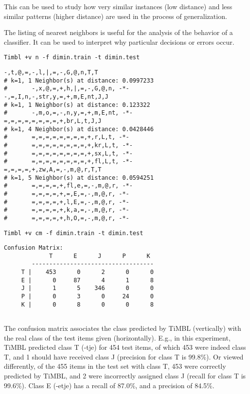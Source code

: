 \documentclass{report}
\begin{document}
This can be used to study how very similar instances (low distance) and
less similar patterns (higher distance) are used in the process of
generalization.

The listing of nearest neighbors is useful for the analysis of the
behavior of a classifier. It can be used to interpret why particular
decisions or errors occur.

{\small
\begin{verbatim}
Timbl +v n -f dimin.train -t dimin.test
\end{verbatim}
}

{\small
\begin{verbatim}
-,t,@,=,-,l,|,=,-,G,@,n,T,T
# k=1, 1 Neighbor(s) at distance: 0.0997233
#       -,x,@,=,+,h,|,=,-,G,@,n, -*-
-,=,I,n,-,str,y,=,+,m,E,nt,J,J
# k=1, 1 Neighbor(s) at distance: 0.123322
#       -,m,o,=,-,n,y,=,+,m,E,nt, -*-
=,=,=,=,=,=,=,=,+,br,L,t,J,J
# k=1, 4 Neighbor(s) at distance: 0.0428446
#       =,=,=,=,=,=,=,=,+,r,L,t, -*-
#       =,=,=,=,=,=,=,=,+,kr,L,t, -*-
#       =,=,=,=,=,=,=,=,+,sx,L,t, -*-
#       =,=,=,=,=,=,=,=,+,fl,L,t, -*-
=,=,=,=,+,zw,A,=,-,m,@,r,T,T
# k=1, 5 Neighbor(s) at distance: 0.0594251
#       =,=,=,=,+,fl,e,=,-,m,@,r, -*-
#       =,=,=,=,+,=,E,=,-,m,@,r, -*-
#       =,=,=,=,+,l,E,=,-,m,@,r, -*-
#       =,=,=,=,+,k,a,=,-,m,@,r, -*-
#       =,=,=,=,+,h,O,=,-,m,@,r, -*-                    
\end{verbatim}
}

{\small
\begin{verbatim}
Timbl +v cm -f dimin.train -t dimin.test
\end{verbatim}
}

{\small
\begin{verbatim}
Confusion Matrix:
             T      E      J      P      K
        -----------------------------------
     T |    453      0      2      0      0
     E |      0     87      4      1      8
     J |      1      5    346      0      0
     P |      0      3      0     24      0
     K |      0      8      0      0      8
                                                  
\end{verbatim}
}

The confusion matrix associates the class predicted by TiMBL
(vertically) with the real class of the test items given
(horizontally). E.g., in this experiment, TiMBL predicted class T
(-tje) for 454 test items, of which 453 were indeed class T, and 1
should have received class J (precision for class T is 99.8\%). Or
viewed differently, of the 455 items in the test set with class T, 453
were correctly predicted by TiMBL, and 2 were incorrectly assigned
class J (recall for class T is 99.6\%). Class E (-etje) has a recall
of 87.0\%, and a precision of 84.5\%.
\end{document}
